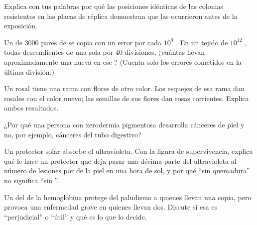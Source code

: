 \begin{exercise}[$\star\star$]\label{exo:g11:mutations:8}
Explica con tus palabras por qué las posiciones idénticas de las
colonias resistentes en las placas de réplica demuestran que las
 ocurrieron antes de la exposición.
\end{exercise}

\begin{exercise}[$\star\star$]\label{exo:g11:mutations:9}
Un  de \num{3000} pares de  se copia con un error por cada
$10^9$ . En un tejido de $10^{12}$ , todas
descendientes de una sola por 40 divisiones, ¿cuántas  llevan
aproximadamente una  nueva en ese ? (Cuenta solo los errores
cometidos en la última división.)
\end{exercise}

\begin{exercise}[$\star\star$]\label{exo:g11:mutations:10}
Un rosal tiene una rama con flores de otro color. Los esquejes de esa
rama dan rosales con el color nuevo; las semillas de sus flores dan
rosas corrientes. Explica ambos resultados.
\end{exercise}

\begin{exercise}[$\star\star$]\label{exo:g11:mutations:11}
¿Por qué una persona con xerodermia pigmentosa desarrolla cánceres de
piel y no, por ejemplo, cánceres del tubo digestivo?
\end{exercise}

\begin{exercise}[$\star\star\star$]\label{exo:g11:mutations:12}
Un protector solar absorbe el ultravioleta. Con la figura de
supervivencia, explica qué le hace un protector que deja pasar una
décima parte del ultravioleta al número de lesiones por  de la
piel en una hora de sol, y por qué ``sin quemadura'' no significa ``sin
''.
\end{exercise}

\begin{exercise}[$\star\star\star$]\label{exo:g11:mutations:13}
Un  del  de la hemoglobina protege del paludismo a quienes
llevan una copia, pero provoca una enfermedad grave en quienes llevan
dos. Discute si esa  es ``perjudicial'' o ``útil'' y qué es lo
que lo decide.
\end{exercise}

